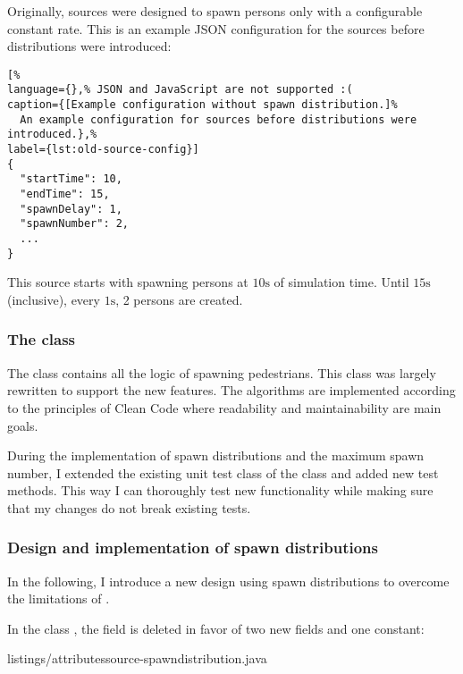 Originally, sources were designed to spawn persons only with a configurable
constant rate.
This is an example \acs{JSON} configuration for the sources before distributions
were introduced:

\begin{lstlisting}[%
language={},% JSON and JavaScript are not supported :(
caption={[Example configuration without spawn distribution.]%
  An example configuration for sources before distributions were introduced.},%
label={lst:old-source-config}]
{
  "startTime": 10,
  "endTime": 15,
  "spawnDelay": 1,
  "spawnNumber": 2,
  ...
}
\end{lstlisting}

This source starts with spawning persons at $10 \si{\second}$ of simulation
time.
Until $15 \si{\second}$ (inclusive), every $1 \si{\second}$, 2 persons are
created.

\subsubsection{The  class}

The  class contains all the logic of spawning
pedestrians.
This class was largely rewritten to support the new features.
The algorithms are implemented according to the principles of Clean
Code \citep{martin2009clean} where readability and maintainability are main
goals.

During the implementation of spawn distributions and the maximum spawn number, I
extended the existing unit test class of the  class and
added new test methods.
This way I can thoroughly test new functionality while making sure that my
changes do not break existing tests.

\subsubsection{Design and implementation of spawn distributions}
\label{subsec:design-impl-spawn-distributions}

In the following, I introduce a new design using spawn distributions to overcome
the limitations of .

In the class , the field  is deleted in
favor of two new fields and one constant:

%
{listings/attributessource-spawndistribution.java}

